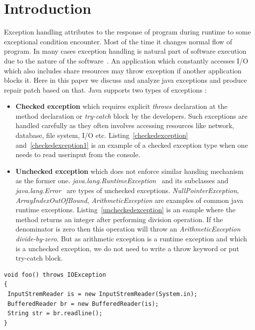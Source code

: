 

\chapter{Introduction}
\label{chapter:introduction}

Exception handling attributes to the response of program during runtime to some
exceptional condition encounter. Most of the time it changes normal flow of
program. In many cases exception handling is natural part of software execution
due to the nature of the software~\cite{JavaException}.
An application which constantly accesses I/O which also includes share resources
may throw exception if another application blocks it.
Here in this paper we discuss and analyze java exceptions and produce repair
patch based on that. Java supports two types of exceptions :

\begin{itemize}
  
  \item \textbf{Checked exception} which requires explicit \emph{throws}
  declaration at the method declaration or \emph{try-catch} block by the
  developers. Such exceptions are handled carefully as they often involves
  accessing resources like network, database, file system, I/O etc.
  Listing~\ref{checkedexception} and~\ref{checkedexception1} is an example of a
  checked exception type when one needs to read userinput from the console.
  
  \item \textbf{Unchecked exception} which does not enforce similar handing
  mechanism as the former one.
  \emph{java.lang.RuntimeException}~\cite{RuntimeException} and its subclasses
  and \emph{java.lang.Error}~\cite{JavaError} are types of unchecked exceptions.
  \emph{NullPointerException}, \emph{ArrayIndexOutOfBound},
  \emph{ArithmeticException} are examples of common java runtime exceptions.
  Listing~\ref{uncheckedexception} is an eample where the method returns an
  integer after performing division operation. If the denominator is zero then
  this operation will throw an \emph{ArithmeticException} \emph{divide-by-zero}.
  But as arithmetic exception is a runtime exception and which is a unchecked
  exception, we do not need to write a throw keyword or put try-catch block.
  
\end{itemize}

\onehalfspacing
\lstset{language=Java, caption=Example 1 of java checked exception,
label=checkedexception}
\begin{lstlisting}
void foo() throws IOException
{
 InputStremReader is = new InputStremReader(System.in);
 BufferedReader br = new BufferedReader(is);
 String str = br.readline();
}
\end{lstlisting}


